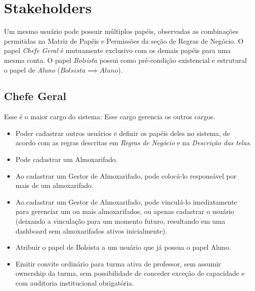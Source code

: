 
\section{Stakeholders}

\begin{explicacao}[Importante]
Um mesmo usuário pode possuir múltiplos papéis, observadas as combinações permitidas na Matriz de Papéis e Permissões da seção de Regras de Negócio. O papel \textit{Chefe Geral} é mutuamente exclusivo com os demais papéis para uma mesma conta. O papel \textit{Bolsista} possui como pré-condição existencial e estrutural o papel de \textit{Aluno} ($Bolsista \implies Aluno$).
\end{explicacao}

\subsection{Chefe Geral}
Esse é o maior cargo do sistema: Esse cargo gerencia os outros cargos.
\begin{itemize}
    \item Poder cadastrar outros usuários e definir os papéis deles no sistema, de acordo com as regras descritas em \textit{Regras de Negócio} e na \textit{Descrição das telas}.
    \item Pode cadastrar um Almoxarifado. 
    \item Ao cadastrar um Gestor de Almoxarifado, pode colocá-lo responsável por mais de um almoxarifado. 
    \item Ao cadastrar um Gestor de Almoxarifado, pode vinculá-lo imediatamente para gerenciar um ou mais almoxarifados, ou apenas cadastrar o usuário (deixando a vinculação para um momento futuro, resultando em uma dashboard sem almoxarifados ativos inicialmente).
    \item Atribuir o papel de Bolsista a um usuário que já possua o papel Aluno.
    \item Emitir convite ordinário para turma ativa de professor, sem assumir ownership da turma, sem possibilidade de conceder exceção de capacidade e com auditoria institucional obrigatória.
\end{itemize}

